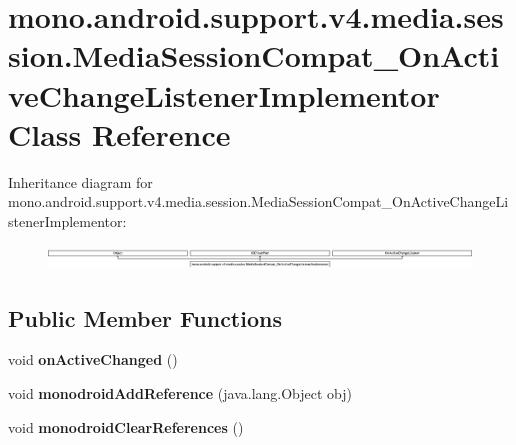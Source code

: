 \hypertarget{classmono_1_1android_1_1support_1_1v4_1_1media_1_1session_1_1MediaSessionCompat__OnActiveChangeListenerImplementor}{}\section{mono.\+android.\+support.\+v4.\+media.\+session.\+Media\+Session\+Compat\+\_\+\+On\+Active\+Change\+Listener\+Implementor Class Reference}
\label{classmono_1_1android_1_1support_1_1v4_1_1media_1_1session_1_1MediaSessionCompat__OnActiveChangeListenerImplementor}
Inheritance diagram for mono.\+android.\+support.\+v4.\+media.\+session.\+Media\+Session\+Compat\+\_\+\+On\+Active\+Change\+Listener\+Implementor\+:\begin{figure}[H]
\begin{center}
\leavevmode
\includegraphics[height=0.638177cm]{classmono_1_1android_1_1support_1_1v4_1_1media_1_1session_1_1MediaSessionCompat__OnActiveChangeListenerImplementor}
\end{center}
\end{figure}
\subsection*{Public Member Functions}
\begin{DoxyCompactItemize}
\item 
\mbox{\label{classmono_1_1android_1_1support_1_1v4_1_1media_1_1session_1_1MediaSessionCompat__OnActiveChangeListenerImplementor_a0672dc8fe59e6c7a18b1755ca87be36d}} 
void {\bfseries on\+Active\+Changed} ()
\item 
\mbox{\label{classmono_1_1android_1_1support_1_1v4_1_1media_1_1session_1_1MediaSessionCompat__OnActiveChangeListenerImplementor_a01e79fbddef692a8bb55ae13792dc8c4}} 
void {\bfseries monodroid\+Add\+Reference} (java.\+lang.\+Object obj)
\item 
\mbox{\label{classmono_1_1android_1_1support_1_1v4_1_1media_1_1session_1_1MediaSessionCompat__OnActiveChangeListenerImplementor_a9734f63b8b6ae5e64326da1f4b548bda}} 
void {\bfseries monodroid\+Clear\+References} ()
\end{DoxyCompactItemize}
